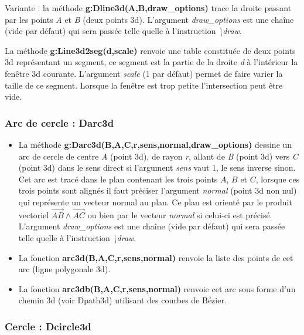 Variante : la méthode \textbf{g:Dline3d(A,B,draw\_options)} trace la droite passant par les points \emph{A} et \emph{B} (deux points 3d). L'argument \emph{draw\_options} est une chaîne (vide par défaut) qui sera passée telle quelle à l'instruction \emph{\textbackslash draw}.

La méthode \textbf{g:Line3d2seg(d,scale)} renvoie une table constituée de deux points 3d représentant un segment, ce segment est la partie de la droite \emph{d} à l'intérieur la fenêtre 3d courante. L'argument \emph{scale} (1 par défaut) permet de faire varier la taille de ce segment. Lorsque la fenêtre est trop petite l'intersection peut être vide.

 \subsubsection{Arc de cercle : Darc3d}
 
\begin{itemize}
    \item La méthode \textbf{g:Darc3d(B,A,C,r,sens,normal,draw\_options)} dessine un arc de cercle de centre \emph{A} (point 3d), de rayon \emph{r}, allant de \emph{B} (point 3d) vers \emph{C} (point 3d) dans le sens direct si l'argument \emph{sens} vaut 1, le sens inverse sinon. Cet arc est tracé dans le plan contenant les trois points $A$, $B$ et $C$, lorsque ces trois points sont alignés il faut préciser l'argument \emph{normal} (point 3d non nul) qui représente un vecteur normal au plan. Ce plan est orienté par le produit vectoriel $\vec{AB}\wedge\vec{AC}$ ou bien par le vecteur \emph{normal} si celui-ci est précisé. L'argument \emph{draw\_options} est une chaîne (vide par défaut) qui sera passée telle quelle à l'instruction \emph{\textbackslash draw}.
    
    \item La fonction \textbf{arc3d(B,A,C,r,sens,normal)} renvoie la liste des points de cet arc (ligne polygonale 3d). 
    
    \item La fonction \textbf{arc3db(B,A,C,r,sens,normal)} renvoie cet arc sous forme d'un chemin 3d (voir Dpath3d) utilisant des courbes de Bézier.
\end{itemize}

\subsubsection{Cercle : Dcircle3d}

